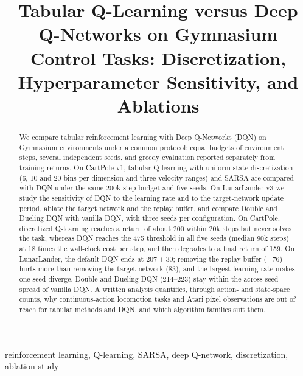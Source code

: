 \documentclass[conference]{IEEEtran}
\begin{document}
\title{Tabular Q-Learning versus Deep Q-Networks on Gymnasium Control Tasks:
Discretization, Hyperparameter Sensitivity, and Ablations}

\author{
\and
{}
}

\maketitle

\begin{abstract}
We compare tabular reinforcement learning with Deep Q-Networks (DQN) on Gymnasium
environments under a common protocol: equal budgets of environment steps, several
independent seeds, and greedy evaluation reported separately from training returns. On
CartPole-v1, tabular Q-learning with uniform state discretization (6, 10 and 20 bins per
dimension and three velocity ranges) and SARSA are compared with DQN under the same
200k-step budget and five seeds. On LunarLander-v3 we study the sensitivity of DQN to the
learning rate and to the target-network update period, ablate the target network and the
replay buffer, and compare Double and Dueling DQN with vanilla DQN, with three seeds per
configuration. On CartPole, discretized Q-learning reaches a return of about 200 within 20k
steps but never solves the task, whereas DQN reaches the 475 threshold in all five seeds
(median 90k steps) at 18 times the wall-clock cost per step, and then degrades to a final
return of 159. On LunarLander, the default DQN ends at $207\pm30$; removing the replay buffer
($-76$) hurts more than removing the target network (83), and the largest learning rate
makes one seed diverge. Double and Dueling DQN (214--223) stay within the across-seed spread
of vanilla DQN. A written analysis quantifies, through action- and state-space counts, why continuous-action
locomotion tasks and Atari pixel observations are out of reach for tabular methods and DQN,
and which algorithm families suit them.
\end{abstract}

\begin{IEEEkeywords}
reinforcement learning, Q-learning, SARSA, deep Q-network, discretization, ablation study
\end{IEEEkeywords}
\end{document}
